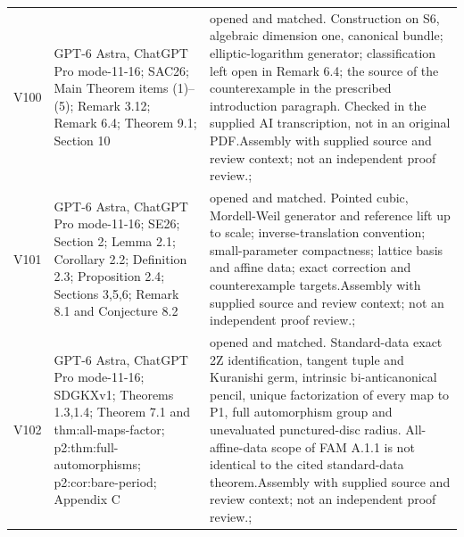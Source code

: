 \documentclass[11pt,a4paper]{article}
\theoremstyle{plain}
\theoremstyle{definition}
\begin{document}
\begin{longtable}{@{}L{.08\linewidth}L{.31\linewidth}L{.56\linewidth}@{}}
V100 & GPT-6 Astra, ChatGPT Pro mode-11-16; S\newline AC26; Main Theorem items (1)--(5); Remark 3.12; Remark 6.4; Theorem 9.1; Section 10 & opened and matched. Construction on S6, algebraic dimension one, canonical bundle; elliptic-logarithm generator; classification left open in Remark 6.4; the source of the counterexample in the prescribed introduction paragraph. Checked in the supplied AI transcription, not in an original PDF.\newline Assembly with supplied source and review context; not an independent proof review.\newline {}; \\
V101 & GPT-6 Astra, ChatGPT Pro mode-11-16; S\newline E26; Section 2; Lemma 2.1; Corollary 2.2; Definition 2.3; Proposition 2.4; Sections 3,5,6; Remark 8.1 and Conjecture 8.2 & opened and matched. Pointed cubic, Mordell-Weil generator and reference lift up to scale; inverse-translation convention; small-parameter compactness; lattice basis and affine data; exact correction and counterexample targets.\newline Assembly with supplied source and review context; not an independent proof review.\newline {}; \\
V102 & GPT-6 Astra, ChatGPT Pro mode-11-16; S\newline DGKXv1; Theorems 1.3,1.4; Theorem 7.1 and thm:\allowbreak{}all-maps-factor; p2:\allowbreak{}thm:\allowbreak{}full-automorphisms; p2:\allowbreak{}cor:\allowbreak{}bare-period; Appendix C & opened and matched. Standard-data exact 2Z identification, tangent tuple and Kuranishi germ, intrinsic bi-anticanonical pencil, unique factorization of every map to P1, full automorphism group and unevaluated punctured-disc radius. All-affine-data scope of FAM A.1.1 is not identical to the cited standard-data theorem.\newline Assembly with supplied source and review context; not an independent proof review.\newline {}; \\

\end{longtable}
\end{document}

